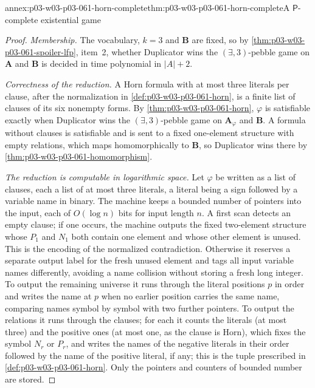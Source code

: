 \begin{annexitem}{annex:p03-w03-p03-061-horn-complete}{thm:p03-w03-p03-061-horn-complete}{A \(\mathsf P\)-complete existential game}
\begin{proof}
\emph{Membership.} The vocabulary, \(k=3\) and \(\mathbf B\) are fixed, so by
\cref{thm:p03-w03-p03-061-spoiler-lfp}, item~2, whether Duplicator wins the
\((\exists,3)\)-pebble game on \(\mathbf A\) and \(\mathbf B\) is decided in
time polynomial in \(|A|+2\).

\emph{Correctness of the reduction.} A Horn formula with at most three
literals per clause, after the normalization in
\cref{def:p03-w03-p03-061-horn}, is a finite list of clauses of its six
nonempty forms. By \cref{thm:p03-w03-p03-061-horn},
\(\varphi\) is satisfiable exactly when Duplicator wins the
\((\exists,3)\)-pebble game on \(\mathbf A_\varphi\) and \(\mathbf B\). A
formula without clauses is satisfiable and is sent to a fixed one-element
structure with empty relations, which maps homomorphically to \(\mathbf B\),
so Duplicator wins there by \cref{thm:p03-w03-p03-061-homomorphism}.

\emph{The reduction is computable in logarithmic space.} Let \(\varphi\) be
written as a list of clauses, each a list of at most three literals, a
literal being a sign followed by a variable name in binary. The machine keeps
a bounded number of pointers into the input, each of \(O(\log n)\) bits for
input length \(n\). A first scan detects an empty clause; if one occurs,
the machine outputs the fixed two-element structure whose \(P_1\) and
\(N_1\) both contain one element and whose other element is unused. This
is the encoding of the normalized contradiction. Otherwise it reserves a
separate output label for the fresh unused element and tags all input
variable names differently, avoiding a name collision without storing a
fresh long integer. To output the remaining universe it runs through the literal
positions \(p\) in order and writes the name at \(p\) when no earlier
position carries the same name, comparing names symbol by symbol with two
further pointers. To output the relations it runs through the clauses; for
each it counts the literals (at most three) and the positive ones (at most
one, as the clause is Horn), which fixes the symbol \(N_r\) or \(P_r\), and
writes the names of the negative literals in their order followed by the
name of the positive literal, if any; this is the tuple prescribed in
\cref{def:p03-w03-p03-061-horn}. Only the pointers and counters of bounded
number are stored.


\end{proof}
\end{annexitem}
